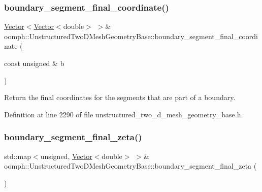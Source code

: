 \subsubsection{\texorpdfstring{boundary\+\_\+segment\+\_\+final\+\_\+coordinate()}{boundary\_segment\_final\_coordinate()}\hspace{0.1cm}{\footnotesize\ttfamily [2/2]}}
{\footnotesize\ttfamily \hyperlink{classoomph_1_1Vector}{Vector}$<$\hyperlink{classoomph_1_1Vector}{Vector}$<$double$>$ $>$\& oomph\+::\+Unstructured\+Two\+D\+Mesh\+Geometry\+Base\+::boundary\+\_\+segment\+\_\+final\+\_\+coordinate (\begin{DoxyParamCaption}\item[{const unsigned \&}]{b }\end{DoxyParamCaption})\hspace{0.3cm}{\ttfamily [inline]}}



Return the final coordinates for the segments that are part of a boundary. 



Definition at line 2290 of file unstructured\+\_\+two\+\_\+d\+\_\+mesh\+\_\+geometry\+\_\+base.\+h.

\mbox{\label{classoomph_1_1UnstructuredTwoDMeshGeometryBase_a0c4ddf7cd3106ffde2b8cbb6528e0d7d}} 
\subsubsection{\texorpdfstring{boundary\+\_\+segment\+\_\+final\+\_\+zeta()}{boundary\_segment\_final\_zeta()}\hspace{0.1cm}{\footnotesize\ttfamily [1/2]}}
{\footnotesize\ttfamily std\+::map$<$unsigned, \hyperlink{classoomph_1_1Vector}{Vector}$<$double$>$ $>$\& oomph\+::\+Unstructured\+Two\+D\+Mesh\+Geometry\+Base\+::boundary\+\_\+segment\+\_\+final\+\_\+zeta (\begin{DoxyParamCaption}{ }\end{DoxyParamCaption})\hspace{0.3cm}{\ttfamily [inline]}}



